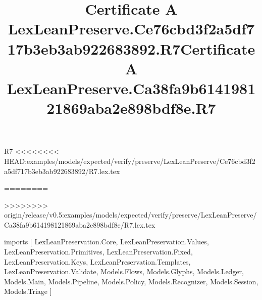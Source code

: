 \begin{lexlean}{R7}
<<<<<<<< HEAD:examples/models/expected/verify/preserve/LexLeanPreserve/Ce76cbd3f2a5df717b3eb3ab922683892/R7.lex.tex
\title{Certificate A LexLeanPreserve.Ce76cbd3f2a5df717b3eb3ab922683892.R7}
========
\title{Certificate A LexLeanPreserve.Ca38fa9b614198121869aba2e898bdf8e.R7}
>>>>>>>> origin/release/v0.5:examples/models/expected/verify/preserve/LexLeanPreserve/Ca38fa9b614198121869aba2e898bdf8e/R7.lex.tex
\begin{coremodule}
imports [
  LexLeanPreservation.Core,
  LexLeanPreservation.Values,
  LexLeanPreservation.Primitives,
  LexLeanPreservation.Fixed,
  LexLeanPreservation.Keys,
  LexLeanPreservation.Templates,
  LexLeanPreservation.Validate,
  Models.Flows,
  Models.Glyphs,
  Models.Ledger,
  Models.Main,
  Models.Pipeline,
  Models.Policy,
  Models.Recognizer,
  Models.Session,
  Models.Triage
]


\end{coremodule}
\end{lexlean}
